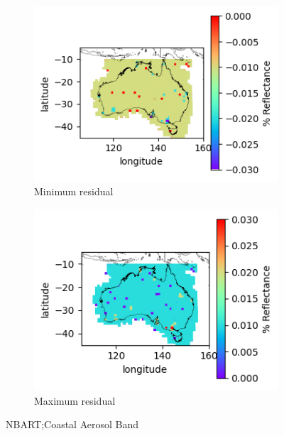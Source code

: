 \documentclass[a4paper]{article}
\begin{document}
      \begin{figure}[h!]
        \centering
          \begin{subfigure}[l]{.4\linewidth}
            \hspace{-32mm}
            \includegraphics[scale=0.9]{plots/nbart/nbart_coastal_aerosol-MinResidual.png}
            \caption{Minimum residual}
          \end{subfigure}
%
          \begin{subfigure}[r]{.4\linewidth}
            \includegraphics[scale=0.9]{plots/nbart/nbart_coastal_aerosol-MaxResidual.png}
            \caption{Maximum residual}
          \end{subfigure}
        \caption{NBART;\@ Coastal Aerosol Band}\label{figure:1}
      \end{figure}
\end{document}
